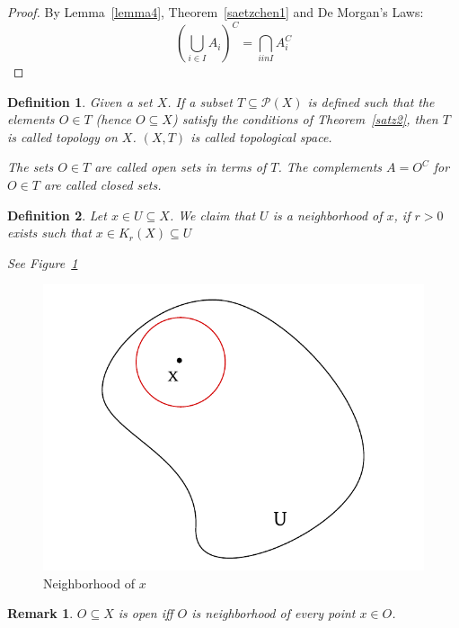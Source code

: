 \documentclass{article}
\newtheorem{definition}{Definition}  \numberwithin{definition}{section}
\newtheorem{remark}{Remark}  \numberwithin{remark}{section}
\begin{document}
\begin{proof}
  By Lemma~\ref{lemma4}, Theorem~\ref{saetzchen1} and De Morgan's Laws:
  \[ \left(\bigcup_{i \in I} A_i\right)^C = \bigcap_{i in I} A_i^C \]
\end{proof}

\begin{definition}
  Given a set $X$. If a subset $T \subseteq \mathcal P(X)$ is defined
  such that the elements $O \in T$ (hence $O \subseteq X$) satisfy the conditions of Theorem~\ref{satz2},
  then $T$ is called \emph{topology on $X$}.
  $(X, T)$ is called topological space.

  The sets $O \in T$ are called \emph{open sets} in terms of $T$.
  The complements $A = O^C$ for $O \in T$ are called \emph{closed sets}.
\end{definition}

\begin{definition}
  Let $x \in U \subseteq X$. We claim that $U$ is a neighborhood of $x$,
  if $r > 0$ exists such that $x \in K_r(X) \subseteq U$

  See Figure~\ref{img:neigh}
\end{definition}

\begin{figure}
  \begin{center}
    \includegraphics{img/06_neighborhood.pdf}
    \caption{Neighborhood of $x$}
    \label{img:neigh}
  \end{center}
\end{figure}

\begin{remark}
  $O \subseteq X$ is open iff $O$ is neighborhood of every point $x \in O$.
\end{remark}
\end{document}
